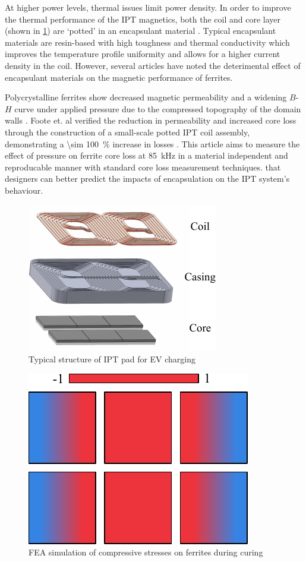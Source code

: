 \documentclass[conference]{IEEEtran}
\begin{document}
At higher power levels, thermal issues limit power density. 
In order to improve the thermal performance of the IPT magnetics, both the coil and core layer (shown in \cref{fig:padstructure}) are `potted' in an encapsulant material \cite{kneidlProcessingInfluencesResinbased2020}. 
Typical encapsulant materials are resin-based with high toughness and thermal conductivity which improves the temperature profile uniformity and allows for a higher current density in the coil. 
However, several articles have noted the deterimental effect of encapsulant materials on the magnetic performance of ferrites. 

Polycrystalline ferrites show decreased magnetic permeability and a widening $B$-$H$ curve under applied pressure due to the compressed topography of the domain walls \cite{leflochEffectPressureSoft1981}. 
Foote et. al verified the reduction in permeability and increased core loss through the construction of a small-scale potted IPT coil assembly, demonstrating a \SI{\sim 100}{\percent} increase in losses \cite{footeEncapsulationResidualStress2023}.
This article aims to measure the effect of pressure on ferrite core loss at \SI{85}{\kilo\hertz} in a material independent and reproducable manner with standard core loss measurement techniques. that designers can better predict the impacts of encapsulation on the IPT system's behaviour. 

\begin{figure}[t]
  \centering
  \includegraphics{figures/padstructure.pdf}
  \caption{Typical structure of IPT pad for EV charging}
  \label{fig:padstructure}
\end{figure}
\begin{figure}[t]
  \centering
  \includegraphics{figures/simulatedpottingpadstresses.pdf}
  \caption{FEA simulation of compressive stresses on ferrites during curing}
  \label{fig:pottingstresses}
\end{figure}
\end{document}
